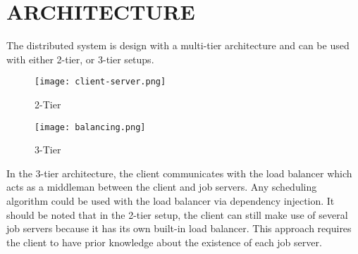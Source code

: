 \section{ARCHITECTURE}\label{sec:architecture}

The distributed system is design with a multi-tier
architecture and can be used with either 2-tier, or 3-tier
setups.

\begin{figure}[H]
    \centering
    \texttt{[image: client-server.png]}
    \caption{2-Tier}
\end{figure}

\begin{figure}[H]
    \centering
    \texttt{[image: balancing.png]}
    \caption{3-Tier}
\end{figure}

In the 3-tier architecture, the client communicates with the load balancer
which acts as a middleman between the client and job servers.
Any scheduling algorithm could be used with the load balancer via
dependency injection.
It should be noted that in the 2-tier setup, the client can still make use
of several job servers because it has its own built-in load balancer.
This approach requires the client to have prior knowledge about
the existence of each job server.
